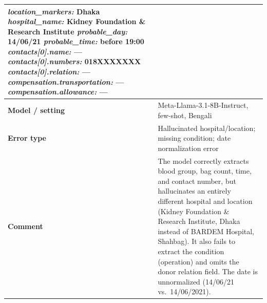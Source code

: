\documentclass[11pt]{article}
\begin{document}
\begin{table}[t]
\begin{tabularx}{\textwidth}{@{}p{}XX@{}}
{\textit{location\_markers:} Dhaka\newline
\textit{hospital\_name:} Kidney Foundation \& Research Institute\newline
\textit{probable\_day:} 14/06/21\newline
\textit{probable\_time:} before 19:00\newline
\textit{contacts[0].name:} ---\newline
\textit{contacts[0].numbers:} 018XXXXXXX\newline
\textit{contacts[0].relation:} ---\newline
\textit{compensation.transportation:} ---\newline
\textit{compensation.allowance:} ---
} \\
\midrule
\textbf{Model / setting} & \multicolumn{2}{p{0.75\textwidth}}{Meta-Llama-3.1-8B-Instruct, few-shot, Bengali} \\
\textbf{Error type} & \multicolumn{2}{p{0.75\textwidth}}{Hallucinated hospital/location; missing condition; date normalization error} \\
\textbf{Comment} & \multicolumn{2}{p{0.75\textwidth}}{The model correctly extracts blood group, bag count, time, and contact number, but hallucinates an entirely different hospital and location (Kidney Foundation \& Research Institute, Dhaka instead of BARDEM Hospital, Shahbag). It also fails to extract the condition (operation) and omits the donor relation field. The date is unnormalized (14/06/21 vs.\ 14/06/2021).} \\
\bottomrule
\end{tabularx}
\end{table}
\end{document}
